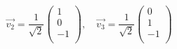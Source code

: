 \documentclass[12pt]{article}
\begin{document}
\[
    \vec{v_2} = \frac{1}{\sqrt{2}} \begin{pmatrix}
        1  \\
        0  \\
        -1 \\
    \end{pmatrix},\quad \vec{v_3} = \frac{1}{\sqrt{2}} \begin{pmatrix}
        0  \\
        1  \\
        -1 \\
    \end{pmatrix}
\]



\newpage


\nocite{arfken2013mathematical}
\nocite{El-Deeb_PEU-356_Assignments}
\end{document}
